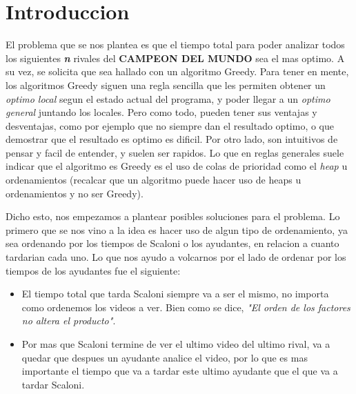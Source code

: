 \section{Introduccion}

El problema que se nos plantea es que el tiempo total para poder analizar todos los siguientes \textbf{\textit {n}} rivales del \textbf{CAMPEON DEL MUNDO} sea el mas optimo. A su vez, se solicita que sea hallado con un algoritmo Greedy. Para tener en mente, los algoritmos Greedy siguen una regla sencilla que les permiten obtener un \textit{optimo local} segun el estado actual del programa, y poder llegar a un \textit{optimo general} juntando los locales. Pero como todo, pueden tener sus ventajas y desventajas, como por ejemplo que no siempre dan el resultado optimo, o que demostrar que el resultado es optimo es dificil. Por otro lado, son intuitivos de pensar y facil de entender, y suelen ser rapidos. Lo que en reglas generales suele indicar que el algoritmo es Greedy es el uso de colas de prioridad como el \textit{heap} u ordenamientos (recalcar que un algoritmo puede hacer uso de heaps u ordenamientos y no ser Greedy).

Dicho esto, nos empezamos a plantear posibles soluciones para el problema. Lo primero que se nos vino a la idea es hacer uso de algun tipo de ordenamiento, ya sea ordenando por los tiempos de Scaloni o los ayudantes, en relacion a cuanto tardarian cada uno. Lo que nos ayudo a volcarnos por el lado de ordenar por los tiempos de los ayudantes fue el siguiente:
\begin{itemize}
    \item El tiempo total que tarda Scaloni siempre va a ser el mismo, no importa como ordenemos los videos a ver. Bien como se dice, \textit{"El orden de los factores no altera el producto"}.
    \item Por mas que Scaloni termine de ver el ultimo video del ultimo rival, va a quedar que despues un ayudante analice el video, por lo que es mas importante el tiempo que va a tardar este ultimo ayudante que el que va a tardar Scaloni. 
\end{itemize}

